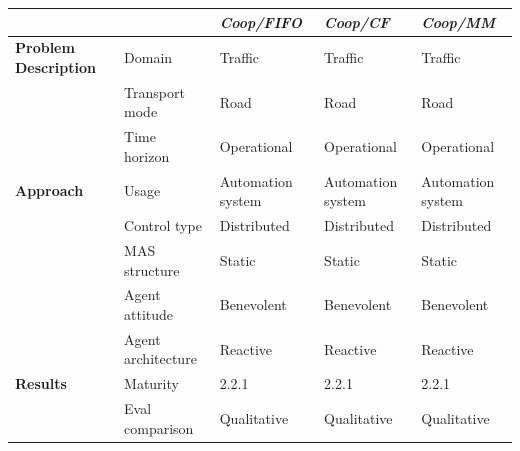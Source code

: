 \documentclass[11pt,letterpaper,onecolumn,twoside,openright,final]{report}
\begin{document}
\begin{table}[htbp]
  \centering
    \begin{tabular}{|l|p{}|p{}|p{}|p{}|}
    \addlinespace
    \hline
          &       & \emph{\textbf{Coop/FIFO}} & \emph{\textbf{Coop/CF}} & \emph{\textbf{Coop/MM}} \\
          \hline
          \hline
    \textbf{Problem Description} & Domain & Traffic & Traffic & Traffic \\
          \cline{2-5}
          & Transport mode & Road  & Road  & Road \\
          \cline{2-5}
          & Time horizon & Operational & Operational & Operational \\
          \hline
    \textbf{Approach} & Usage & Automation system & Automation system & Automation system \\
          \cline{2-5}
          & Control type & Distributed & Distributed & Distributed \\
          \cline{2-5}
          & MAS structure & Static & Static & Static \\
          \cline{2-5}
          & Agent attitude & Benevolent & Benevolent & Benevolent \\
          \cline{2-5}
          & Agent architecture & Reactive & Reactive & Reactive \\
          \hline
    \textbf{Results} & Maturity & 2.2.1 & 2.2.1 & 2.2.1 \\
          \cline{2-5}
          & Eval comparison & Qualitative & Qualitative & Qualitative \\
          \hline
          \hline
          \cline{2-5}
%

\end{tabular}
\end{table}
\end{document}
